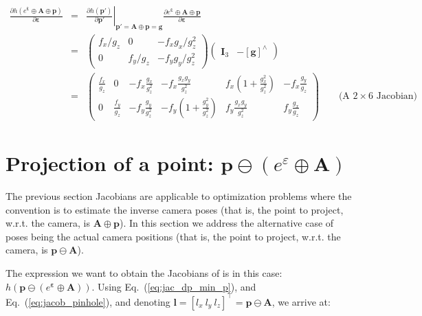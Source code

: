 \documentclass[a4paper,11pt]{report}
\newcommand{\E}{{\bm{\varepsilon}}}
\newcommand{\A}{{\mathbf{A}}}
\newcommand{\hatop}[1]{#1^\wedge}
\begin{document}
\begin{eqnarray}
\frac{\partial h(e^\E \oplus \A \oplus \mathbf{p})}{\partial \mathbf{\E}}
&=&
\left. \frac{\partial h(\mathbf{p'})}{\partial \mathbf{p'}} \right|_{ \mathbf{p'} = \A \oplus \mathbf{p} = \mathbf{g} }
\frac{\partial e^\E \oplus \A \oplus \mathbf{p} }{\partial \E} \\
&=&
\left(
\begin{array}{ccc}
 f_x / g_z   &    0    &  -f_x g_x / g_z^2   \\
 0 & f_y / g_z  &  -f_y g_y / g_z^2
\end{array}
\right)
\left(
\begin{array}{cc}
 \mathbf{I}_3   & - \hatop{\left[ \mathbf{g} \right]}
\end{array}
\right) \\
&=&
\left(
\begin{array}{cccccc}
 \frac{f_x}{g_z}  &
 0 &
 -f_x\frac{g_x}{g_z^2} &
 -f_x \frac{g_x g_y}{g_z^2} &
  f_x  (1 + \frac{g_x^2}{g_z^2} )  &
 -f_x \frac{g_y}{g_z}
\\
 0 &
 \frac{f_y}{g_z}  &
 -f_y\frac{g_y}{g_z^2}
 &
  -f_y (1 + \frac{g_y^2}{g_z^2}) &
  f_y \frac{g_x g_y}{g_z^2} &
  f_y \frac{g_x}{g_z}
\end{array}
\right)
\quad\quad \text{(A $2 \times 6$ Jacobian)} \nonumber
\end{eqnarray}



\newpage

\section{Projection of a point: $\mathbf{p} \ominus (e^\varepsilon \oplus \mathbf{A})$}

The previous section Jacobians are applicable to optimization problems
where the convention is to estimate the inverse camera poses
(that is, the point to project, w.r.t. the camera, is $\A \oplus \mathbf{p}$).
In this section we address the alternative case of poses being the actual
camera positions
(that is, the point to project, w.r.t. the camera, is $\mathbf{p} \ominus \A$).

The expression we want to obtain the Jacobians of is in this case:
$h(\mathbf{p} \ominus (e^\E \oplus \A))$.
Using Eq.~(\ref{eq:jac_dp_min_p}),
and  Eq.~(\ref{eq:jacob_pinhole}),
and denoting $\mathbf{l}=[l_x ~ l_y ~ l_z]^\top=\mathbf{p} \ominus \A$,
we arrive at:
\end{document}
